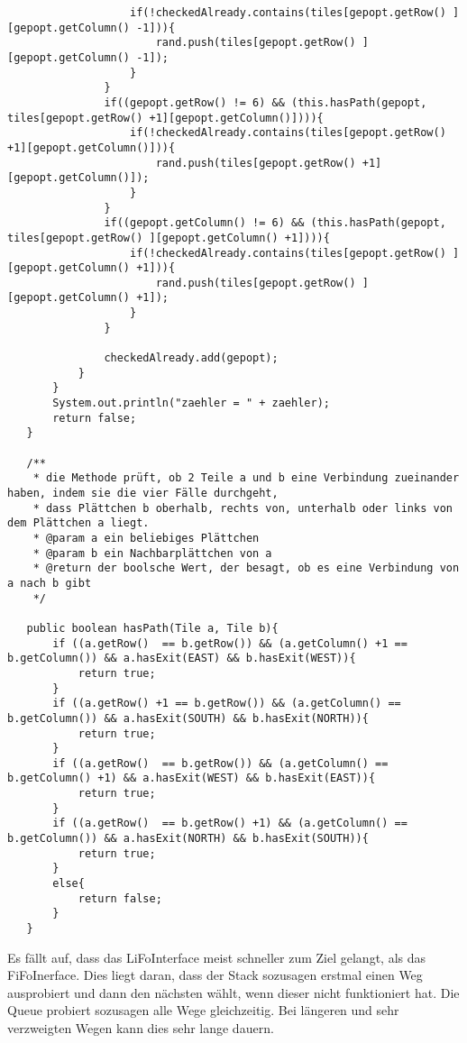 \documentclass{pi2}
\begin{document}
\begin{lstlisting}
				   if(!checkedAlready.contains(tiles[gepopt.getRow() ][gepopt.getColumn() -1])){
					   rand.push(tiles[gepopt.getRow() ][gepopt.getColumn() -1]);
				   }
			   }
			   if((gepopt.getRow() != 6) && (this.hasPath(gepopt, tiles[gepopt.getRow() +1][gepopt.getColumn()]))){
				   if(!checkedAlready.contains(tiles[gepopt.getRow() +1][gepopt.getColumn()])){
					   rand.push(tiles[gepopt.getRow() +1][gepopt.getColumn()]);
				   }
			   }
			   if((gepopt.getColumn() != 6) && (this.hasPath(gepopt, tiles[gepopt.getRow() ][gepopt.getColumn() +1]))){
				   if(!checkedAlready.contains(tiles[gepopt.getRow() ][gepopt.getColumn() +1])){
					   rand.push(tiles[gepopt.getRow() ][gepopt.getColumn() +1]);
				   }
			   }
			   
			   checkedAlready.add(gepopt);
		   }
	   }
	   System.out.println("zaehler = " + zaehler);
	   return false;
   }

   /** 
    * die Methode prüft, ob 2 Teile a und b eine Verbindung zueinander haben, indem sie die vier Fälle durchgeht,
    * dass Plättchen b oberhalb, rechts von, unterhalb oder links von dem Plättchen a liegt.
    * @param a ein beliebiges Plättchen
    * @param b ein Nachbarplättchen von a
    * @return der boolsche Wert, der besagt, ob es eine Verbindung von a nach b gibt
    */
    
   public boolean hasPath(Tile a, Tile b){
	   if ((a.getRow()  == b.getRow()) && (a.getColumn() +1 == b.getColumn()) && a.hasExit(EAST) && b.hasExit(WEST)){
		   return true;
	   }
	   if ((a.getRow() +1 == b.getRow()) && (a.getColumn() == b.getColumn()) && a.hasExit(SOUTH) && b.hasExit(NORTH)){
		   return true;
	   }
	   if ((a.getRow()  == b.getRow()) && (a.getColumn() == b.getColumn() +1) && a.hasExit(WEST) && b.hasExit(EAST)){
		   return true;
	   }
	   if ((a.getRow()  == b.getRow() +1) && (a.getColumn() == b.getColumn()) && a.hasExit(NORTH) && b.hasExit(SOUTH)){
		   return true;
	   }
	   else{
		   return false;
	   }
   }
\end{lstlisting}

Es fällt auf, dass das LiFoInterface meist schneller zum Ziel gelangt, als das FiFoInerface. Dies liegt daran, dass der Stack sozusagen erstmal einen Weg ausprobiert und dann den nächsten wählt, wenn dieser nicht funktioniert hat. Die Queue probiert sozusagen alle Wege gleichzeitig. Bei längeren und sehr verzweigten Wegen kann dies sehr lange dauern.
\end{document}
